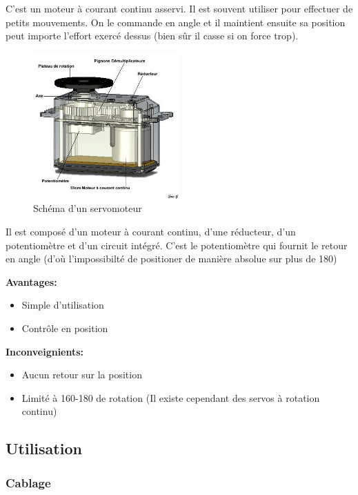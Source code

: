 \documentclass[a4paper, 11pt]{report}
\begin{document}
C'est un moteur à courant continu asservi. Il est souvent utiliser pour effectuer de petits mouvements. On le commande en angle et il maintient ensuite sa position peut importe l'effort exercé dessus (bien sûr il casse si on force trop).

\begin{figure}[h]
\begin{centering}
\includegraphics[width=0.5\textwidth]{images/schemaServo.jpg}
\caption{Schéma d'un servomoteur}
\par\end{centering}
\end{figure}

Il est composé d'un moteur à courant continu, d'une réducteur, d'un potentiomètre et d'un circuit intégré. C'est le potentiomètre qui fournit le retour en angle (d'où l'impossibilté de positioner de manière absolue sur plus de 180\degre)

\textbf{Avantages:}
\begin{itemize}
\item Simple d'utilisation
\item Contrôle en position
\end{itemize}

\textbf{Inconveignients:}
\begin{itemize}
\item Aucun retour sur la position
\item Limité à 160-180 \degre de rotation (Il existe cependant des servos à rotation continu)
\end{itemize}

\subsection{Utilisation}

\subsubsection{Cablage}
\end{document}
